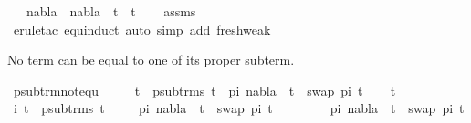\begin{isabellebody}
\ \ \ {\isachardoublequoteopen}{\isacharparenleft}{\kern0pt}nabla{}\ {\isasymunion}\ nabla{}{\isacharparenright}{\kern0pt}\ {\isasymturnstile}\ t{}\ {\isasymapprox}\ t{}{\isachardoublequoteclose}\isanewline
%
\isadelimproof
\ \ %
\endisadelimproof
%
\isatagproof
{}\isamarkupfalse%
\ assms\ \isamarkupfalse%
\ {\isacharparenleft}{\kern0pt}erule{\isacharunderscore}{\kern0pt}tac\ equ{\isachardot}{\kern0pt}induct{\isacharparenright}{\kern0pt}\ {\isacharparenleft}{\kern0pt}auto\ simp\ add{\isacharcolon}{\kern0pt}\ fresh{\isacharunderscore}{\kern0pt}weak{\isacharparenright}{\kern0pt}%
\endisatagproof
{\isafoldproof}%
%
\isadelimproof
%
\endisadelimproof
%
\begin{isamarkuptext}%
No term can be equal to one of its proper subterm.%
\end{isamarkuptext}\isamarkuptrue%
\isamarkupfalse%
\ psub{\isacharunderscore}{\kern0pt}trm{\isacharunderscore}{\kern0pt}not{\isacharunderscore}{\kern0pt}equ{\isacharcolon}{\kern0pt}\ \isanewline
\ \ \ {\isachardoublequoteopen}{\isasymforall}\ t{}\ {\isasymin}\ psub{\isacharunderscore}{\kern0pt}trms\ t{}{\isachardot}{\kern0pt}\ {\isacharparenleft}{\kern0pt}{\isasymnot}{\isacharparenleft}{\kern0pt}{\isasymexists}\ pi{\isachardot}{\kern0pt}\ {\isacharparenleft}{\kern0pt}nabla\ {\isasymturnstile}\ t{}\ {\isasymapprox}\ swap\ pi\ t{}{\isacharparenright}{\kern0pt}{\isacharparenright}{\kern0pt}{\isacharparenright}{\kern0pt}{\isachardoublequoteclose}\isanewline
%
\isadelimproof
%
\endisadelimproof
%
\isatagproof
{}\isamarkupfalse%
\isanewline
\ \ \isamarkupfalse%
\ t{}\isanewline
\ \ \isamarkupfalse%
\ i{\isacharcolon}{\kern0pt}\ {\isachardoublequoteopen}t{}\ {\isasymin}\ psub{\isacharunderscore}{\kern0pt}trms\ t{}{\isachardoublequoteclose}\isanewline
\ \ \isamarkupfalse%
\ {\isachardoublequoteopen}{\isasymnot}\ {\isacharparenleft}{\kern0pt}{\isasymexists}pi{\isachardot}{\kern0pt}\ nabla\ {\isasymturnstile}\ t{}\ {\isasymapprox}\ swap\ pi\ t{}{\isacharparenright}{\kern0pt}{\isachardoublequoteclose}\isanewline
\ \ \isamarkupfalse%
\isanewline
\ \ \ \ \isamarkupfalse%
\ {\isachardoublequoteopen}{\isasymexists}pi{\isachardot}{\kern0pt}\ nabla\ {\isasymturnstile}\ t{}\ {\isasymapprox}\ swap\ pi\ t{}{\isachardoublequoteclose}\isanewline

\end{isabellebody}
